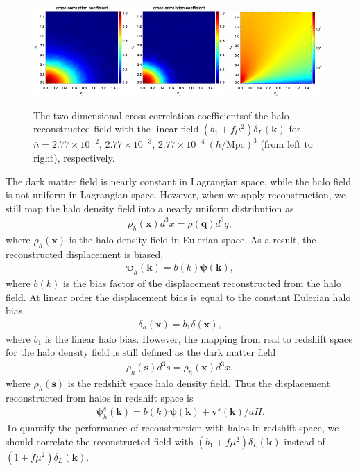 \documentclass[aps,prx,twocolumn,superscriptaddress,groupedaddress,nofootinbib,amsfont]{revtex4}  %
\newcommand{\mr}{\mathrm}
\newcommand{\bea}{\begin{eqnarray}}
\newcommand{\eea}{\end{eqnarray}}
\newcommand{\bmp}{\bm{\psi}}
\newcommand{\bmv}{\bm{v}}
\newcommand{\bmk}{\bm{k}}
\newcommand{\bmx}{\bm{x}}
\newcommand{\bms}{\bm{s}}
\newcommand{\bmq}{\bm{q}}
\begin{document}
\begin{figure}[tbp]
\begin{center}
\includegraphics[width=0.32\textwidth]{0.000anixcc_deltaRsxLs-0_31-1.eps}
\includegraphics[width=0.32\textwidth]{0.000anixcc_deltaRsxLs-1_31-1.eps}
\includegraphics[width=0.32\textwidth]{0.000anipk_deltaV_4x.eps}
\end{center}
\vspace{-0.7cm}
\caption{The two-dimensional cross correlation coefficientsof the halo 
reconstructed field with the linear field $(b_1+f\mu^2)\delta_L(\bmk)$ for
$\bar{n}=2.77\times10^{-2}$, $2.77\times10^{-3}$, $2.77\times10^{-4}\ (h/\mr{Mpc})^3$ (from left to right), respectively.}
\label{fig:xcc_ha}
\end{figure}

The dark matter field is nearly constant in Lagrangian space, while the halo 
field is not uniform in Lagrangian space. 
However, when we apply reconstruction,
we still map the halo density field into a nearly uniform distribution as
\bea
\rho_h(\bmx)d^3x=\rho(\bmq)d^3q,
\eea
where $\rho_h(\bmx)$ is the halo density field in Eulerian space. As a result,
the reconstructed displacement is biased,
\bea
\bmp_h(\bmk)=b(k)\bmp(\bmk),
\eea
where $b(k)$ is the bias factor of the displacement reconstructed from the 
halo field. At linear order the displacement bias is equal to the constant 
Eulerian halo bias,
\bea
\delta_h(\bmx)=b_1\delta(\bmx),
\eea
where $b_1$ is the linear halo bias. However, the mapping from real to redshift
space for the halo density field is still defined as the dark matter field
\bea
\rho_h(\bms)d^3s=\rho_h(\bmx)d^3x,
\eea
where $\rho_h(\bms)$ is the redshift space halo density field. 
Thus the displacement reconstructed from halos in redshift space is 
\bea
\bmp^s_h(\bmk)=b(k)\bmp(\bmk)+{\bmv^s(\bmk)}/{aH}.
\eea
To quantify the performance of reconstruction with halos in redshift space,
we should correlate the reconstructed field with $(b_1+f\mu^2)\delta_L(\bmk)$
instead of $(1+f\mu^2)\delta_L(\bmk)$.
\end{document}

